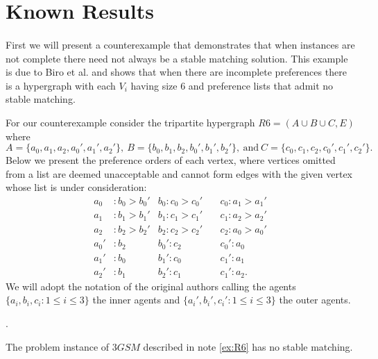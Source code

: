 \section{Known Results}
\paragraph{}
First we will present a counterexample that demonstrates that when instances are not complete there need not always be a stable matching solution. This example is due to Biro et al. \cite{biro2010three} and shows that when there are incomplete preferences there is a hypergraph with each $V_i$ having size $6$ and preference lists that admit no stable matching.
\begin{note}\label{ex:R6}
For our counterexample consider the tripartite hypergraph $R6 = (A \cup B \cup C, E)$ where $$A = \{a_0, a_1,a_2,a_0', a_1',a_2'\},\ B = \{b_0, b_1,b_2,b_0',b_1',b_2'\},\ \text{and}\ C = \{c_0,c_1,c_2,c_0',c_1',c_2'\}.$$ Below we present the preference orders of each vertex, where vertices omitted from a list are deemed unacceptable and cannot form edges with the given vertex whose list is under consideration:
\begin{align*}
a_0 &: b_0 > b_0' &b_0: c_0 > c_0' &\ &c_0:a_1 > a_1'\\
a_1 &: b_1 > b_1' &b_1: c_1 > c_1' &\ &c_1:a_2 > a_2'\\
a_2 &: b_2 > b_2' &b_2: c_2 > c_2' &\ &c_2: a_0> a_0'\\
a_0' &: b_2 &b_0': c_2 &\ &c_0':a_0 \\
a_1'&: b_0 &b_1': c_0 &\ &c_1':a_1\\
a_2' &:b_1 &b_2': c_1 &\ & c_1':a_2.
\end{align*}
We will adopt the notation of the original authors calling the agents $\{a_i, b_i, c_i: 1 \leq i \leq 3 \}$ the inner agents and $\{a_i',b_i',c_i': 1\leq i \leq 3\}$ the outer agents.
\end{note}.
\begin{lemma}
The problem instance of $3GSM$ described in note \ref{ex:R6} has no stable matching.
\end{lemma}
